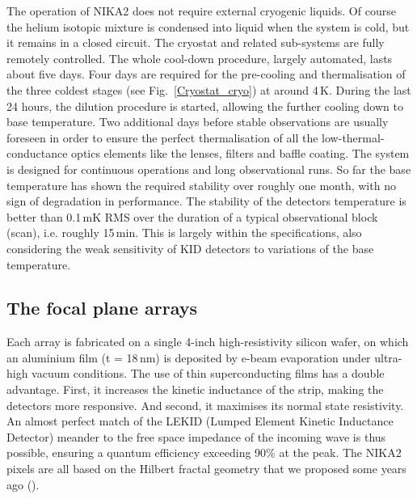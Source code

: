 \documentclass[]{aa} %
\begin{document}
The operation of NIKA2 does not require external cryogenic liquids. Of course the helium isotopic mixture is condensed into liquid when the system is cold, but it remains in a closed circuit. The cryostat and related sub-systems are fully remotely controlled. The whole cool-down procedure, largely automated, lasts about five days. Four days are required for the pre-cooling and thermalisation of the three coldest stages (see Fig.~\ref{Cryostat_cryo}) at around 4\,K. During the last 24 hours, the dilution procedure is started, allowing the further cooling down to base temperature. Two additional days before stable observations are usually foreseen in order to ensure the perfect thermalisation of all the low-thermal-conductance optics elements like the lenses, filters and baffle coating. The system is designed for continuous operations and long observational runs. So far the base temperature has shown the required stability over roughly one month, with no sign of degradation in performance. The stability of the detectors temperature is better than 0.1\,mK RMS over the duration of a typical observational block (scan), i.e. roughly 15\,min. This is largely within the specifications, also considering the weak sensitivity of KID detectors to variations of the base temperature. 


 \subsection{The focal plane arrays}

Each array is fabricated on a single 4-inch high-resistivity silicon wafer, on which an aluminium film (t = 18\,nm) is deposited by e-beam evaporation under ultra-high vacuum conditions. The use of thin superconducting films has a double advantage. First, it increases the kinetic inductance of the strip, making the detectors more responsive. And second, it maximises its normal state resistivity. An almost perfect match of the LEKID (Lumped Element Kinetic Inductance Detector) meander to the free space impedance of the incoming wave is thus possible, ensuring a quantum efficiency exceeding 90\% at the peak. The NIKA2 pixels are all based on the Hilbert fractal geometry that we proposed some years ago (\cite{Roesch2012}). 
\end{document}
